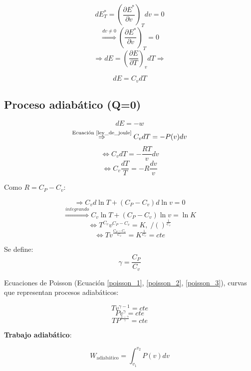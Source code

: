     \[dE_{T}^{*}=\left ( \frac{\partial E^{*}}{\partial v} \right )_{T} dv=0\]
    \[\overset{dv \neq 0}{\Rightarrow} \left ( \frac{\partial E^{*}}{\partial v} \right )_{T} =0\]
    \[\Rightarrow dE = \left ( \frac{\partial E}{\partial T} \right )_{v} dT \Rightarrow \]
    
    \begin{equation}
    \label{ley_de_joule}
        dE=C_{v}dT
    \end{equation}
    
    \subsection{Proceso adiabático (Q=0)}
    
    \[dE = -w\]
    \[\overset{\text{Ecuación \ref{ley_de_joule}}}{\Rightarrow} C_{v}dT=-P(v)dv\]
    \[\Leftrightarrow C_{v}dT=-\frac{RT}{v}dv\]
    \[\Leftrightarrow C_{v}\frac{dT}{T}=-R\frac{dv}{v}\]
    
    Como \(R=C_{P}-C_{v}\):
    
    \[\Rightarrow C_{v}d\ln T + \left ( C_{P} - C_{v} \right ) d\ln v=0\]
    \[\overset{integrando}{\Rightarrow} C_{v}\ln T + \left ( C_{P} - C_{v} \right ) \ln v=\ln K\]
    \[\Leftrightarrow T^{C_{v}}v^{C_{P}-C_{v}} = K,\;/{()}^{\frac{1}{C_{v}}}\]
    \[\Leftrightarrow Tv^{\frac{C_{P}-C_{v}}{C_{v}}}=K^{\frac{1}{C_{v}}}=cte\]
    
    Se define:
    \begin{equation}
        \gamma = \frac{C_{P}}{C_{v}}
    \end{equation}
    
    Ecuaciones de Poisson (Ecuación \ref{poisson_1}, \ref{poisson_2}, \ref{poisson_3}), curvas que representan procesos adiabáticos:
    
    \begin{equation}
    \label{poisson_1}
        Tv^{\gamma - 1} = cte
    \end{equation}
    \begin{equation}
    \label{poisson_2}
        Pv^{\gamma} = cte
    \end{equation}
    \begin{equation}
    \label{poisson_3}
        TP^{\frac{1 - \gamma}{\gamma}} = cte
    \end{equation}
    
    \textbf{Trabajo adiabático}:
    
    \[W_{\text{adiabático}}=\int_{v_{1}}^{v_{2}}P(v)dv\]
    
